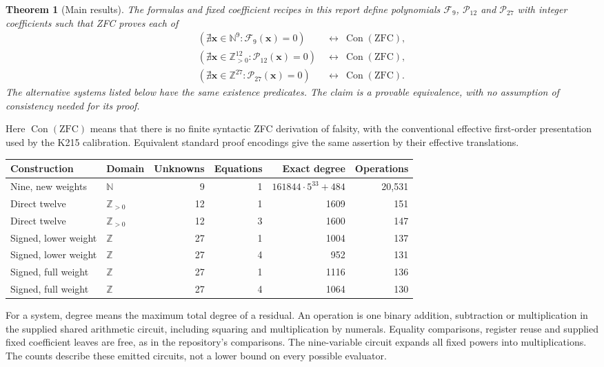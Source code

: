 \documentclass[11pt,a4paper]{article}
\newtheorem{theorem}{Theorem}[section]
\theoremstyle{remark}
\newcommand{\NN}{\mathbb N}
\newcommand{\ZZ}{\mathbb Z}
\newcommand{\Con}{\operatorname{Con}}
\newcommand{\ZFC}{\mathrm{ZFC}}
\begin{document}
\begin{theorem}[Main results]
\label{thm:main}
The formulas and fixed coefficient recipes in this report define
polynomials $\mathcal F_9$, $\mathcal P_{12}$ and $\mathcal P_{27}$ with
integer coefficients such that ZFC proves each of
\begin{align*}
 (\nexists \mathbf x\in\NN^9:\mathcal F_9(\mathbf x)=0)
      &\ \longleftrightarrow\ \Con(\ZFC),\\
 (\nexists \mathbf x\in\ZZ_{>0}^{12}:\mathcal P_{12}(\mathbf x)=0)
      &\ \longleftrightarrow\ \Con(\ZFC),\\
 (\nexists \mathbf x\in\ZZ^{27}:\mathcal P_{27}(\mathbf x)=0)
      &\ \longleftrightarrow\ \Con(\ZFC).
\end{align*}
The alternative systems listed below have the same existence predicates.
The claim is a provable equivalence, with no assumption of consistency
needed for its proof.
\end{theorem}

Here $\Con(\ZFC)$ means that there is no finite syntactic ZFC derivation
of falsity, with the conventional effective first-order presentation
used by the K215 calibration.  Equivalent standard proof encodings give
the same assertion by their effective translations.

\begin{center}
\small
\begin{tabular}{@{}llrrrr@{}}
\toprule
Construction & Domain & Unknowns & Equations & Exact degree & Operations\\
\midrule
Nine, new weights & $\NN$ & 9 & 1 & $161844\cdot5^{33}+484$ & 20,531\\
Direct twelve & $\ZZ_{>0}$ & 12 & 1 & 1609 & 151\\
Direct twelve & $\ZZ_{>0}$ & 12 & 3 & 1600 & 147\\
Signed, lower weight & $\ZZ$ & 27 & 1 & 1004 & 137\\
Signed, lower weight & $\ZZ$ & 27 & 4 & 952 & 131\\
Signed, full weight & $\ZZ$ & 27 & 1 & 1116 & 136\\
Signed, full weight & $\ZZ$ & 27 & 4 & 1064 & 130\\
\bottomrule
\end{tabular}
\end{center}

For a system, degree means the maximum total degree of a residual.  An
operation is one binary addition, subtraction or multiplication in the
supplied shared arithmetic circuit, including squaring and multiplication
by numerals.  Equality comparisons, register reuse and supplied fixed
coefficient leaves are free, as in the repository's comparisons.  The
nine-variable circuit expands all fixed powers into multiplications.
The counts describe these emitted circuits, not a lower bound on every
possible evaluator.
\end{document}

